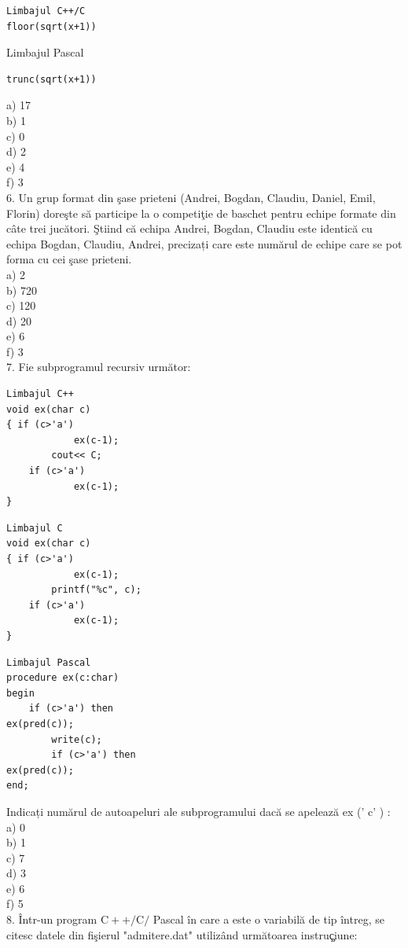 \documentclass[10pt]{article}
\begin{document}
\begin{verbatim}
Limbajul C++/C
floor(sqrt(x+1))
\end{verbatim}

Limbajul Pascal

\begin{verbatim}
trunc(sqrt(x+1))
\end{verbatim}

a) 17\\
b) 1\\
c) 0\\
d) 2\\
e) 4\\
f) 3\\
6. Un grup format din şase prieteni (Andrei, Bogdan, Claudiu, Daniel, Emil, Florin) doreşte să participe la o competiţie de baschet pentru echipe formate din câte trei jucători. Ştiind că echipa Andrei, Bogdan, Claudiu este identică cu echipa Bogdan, Claudiu, Andrei, precizați care este numărul de echipe care se pot forma cu cei şase prieteni.\\
a) 2\\
b) 720\\
c) 120\\
d) 20\\
e) 6\\
f) 3\\
7. Fie subprogramul recursiv următor:

\begin{verbatim}
Limbajul C++
void ex(char c)
{ if (c>'a')
            ex(c-1);
        cout<< C;
    if (c>'a')
            ex(c-1);
}
\end{verbatim}

\begin{verbatim}
Limbajul C
void ex(char c)
{ if (c>'a')
            ex(c-1);
        printf("%c", c);
    if (c>'a')
            ex(c-1);
}
\end{verbatim}

\begin{verbatim}
Limbajul Pascal
procedure ex(c:char)
begin
    if (c>'a') then
ex(pred(c));
        write(c);
        if (c>'a') then
ex(pred(c));
end;
\end{verbatim}

Indicați numărul de autoapeluri ale subprogramului dacă se apelează ex (' c' ) :\\
a) 0\\
b) 1\\
c) 7\\
d) 3\\
e) 6\\
f) 5\\
8. Într-un program $\mathrm{C}++/ \mathrm{C} /$ Pascal în care a este o variabilă de tip întreg, se citesc datele din fişierul "admitere.dat" utilizând următoarea instruç̧iune:
\end{document}
